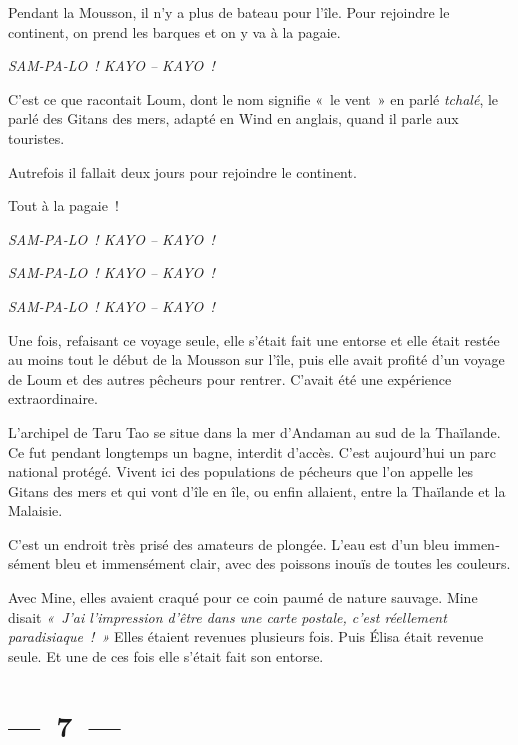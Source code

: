 \documentclass[twoside]{book} %
\begin{document}
\noindent Pendant la Mousson, il n’y a plus de bateau pour l’île. Pour rejoindre le continent, on prend les barques et on y va à la pagaie.\par
{\centering\itshape \noindent SAM-PA-LO ! KAYO – KAYO !\par}
\noindent C’est ce que racontait Loum, dont le nom signifie « le vent » en parlé \emph{tchalé}, le parlé des Gitans des mers, adapté en Wind en anglais, quand il parle aux touristes.\par
Autrefois il fallait deux jours pour rejoindre le continent.\par
Tout à la pagaie !\par
{\centering\itshape \noindent SAM-PA-LO ! KAYO – KAYO !\par}
{\centering\itshape \noindent SAM-PA-LO ! KAYO – KAYO !\par}
{\centering\itshape \noindent SAM-PA-LO ! KAYO – KAYO !\par}
\bigbreak
\noindent Une fois, refaisant ce voyage seule, elle s’était fait une entorse et elle était restée au moins tout le début de la Mousson sur l’île, puis elle avait profité d’un voyage de Loum et des autres pêcheurs pour rentrer. C’avait été une expérience extraordinaire.\par
L’archipel de Taru Tao se situe dans la mer d’Andaman au sud de la Thaïlande. Ce fut pendant longtemps un bagne, interdit d’accès. C’est aujourd’hui un parc national protégé. Vivent ici des populations de pécheurs que l’on appelle les Gitans des mers et qui vont d’île en île, ou enfin allaient, entre la Thaïlande et la Malaisie.\par
C’est un endroit très prisé des amateurs de plongée. L’eau est d’un bleu immen­sément bleu et immensément clair, avec des poissons inouïs de toutes les couleurs.\par
Avec Mine, elles avaient craqué pour ce coin paumé de nature sauvage. Mine disait \emph{« J’ai l’impression d’être dans une carte postale, c’est réellement paradisiaque ! »} Elles étaient revenues plusieurs fois. Puis Élisa était revenue seule. Et une de ces fois elle s’était fait son entorse.

\section[{— 7 —}]{— 7 —}
\renewcommand{\leftmark}{— 7 —}
\end{document}
